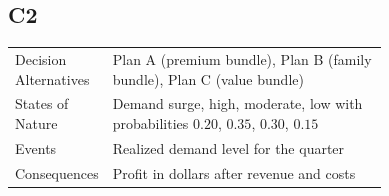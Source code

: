 \begin{ExamProblems}
			\subsection*{C2}
			\begin{center}
				\begin{tabular}{l p{0.74\linewidth}}
					\toprule
					Decision Alternatives & Plan A (premium bundle), Plan B (family bundle), Plan C (value bundle) \\
					States of Nature & Demand surge, high, moderate, low with probabilities $0.20$, $0.35$, $0.30$, $0.15$ \\
					Events & Realized demand level for the quarter \\
					Consequences & Profit in dollars after revenue and costs \\
					\bottomrule
				\end{tabular}
			\end{center}
	

\end{ExamProblems}
